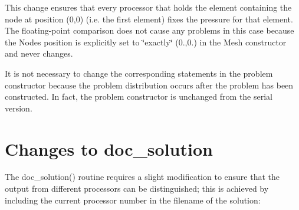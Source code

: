 This change ensures that every processor that holds the element containing the node at position (0,0) (i.\+e. the first element) fixes the pressure for that element. The floating-\/point comparison does not cause any problems in this case because the {\ttfamily Node\textquotesingle{}s} position is explicitly set to \char`\"{}exactly\char`\"{} (0.,0.) in the Mesh constructor and never changes.

It is not necessary to change the corresponding statements in the problem constructor because the problem distribution occurs after the problem has been constructed. In fact, the problem constructor is unchanged from the serial version.



\hypertarget{index_doc_solution}{}\section{Changes to doc\+\_\+solution}\label{index_doc_solution}
The {\ttfamily doc\+\_\+solution()} routine requires a slight modification to ensure that the output from different processors can be distinguished; this is achieved by including the current processor number in the filename of the solution\+:








